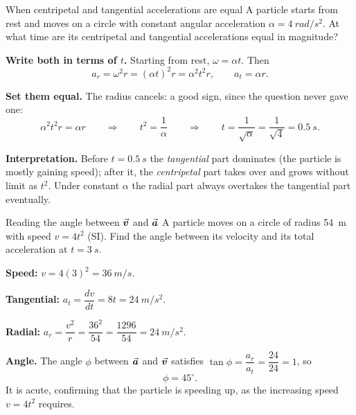 \begin{exbox}{When centripetal and tangential accelerations are equal}
A particle starts from rest and moves on a circle with constant angular acceleration
$\alpha=\SI{4}{rad/s^2}$. At what time are its centripetal and tangential accelerations equal in
magnitude?

 \textbf{Write both in terms of $t$.} Starting from rest, $\omega=\alpha t$. Then
\[
a_r=\omega^{2}r=(\alpha t)^{2}r=\alpha^{2}t^{2}r,
\qquad
a_t=\alpha r.
\]

 \textbf{Set them equal.} The radius cancels: a good sign, since the question never gave
one:
\[
\alpha^{2}t^{2}r=\alpha r
\qquad\Longrightarrow\qquad
t^{2}=\frac{1}{\alpha}
\qquad\Longrightarrow\qquad
t=\frac{1}{\sqrt\alpha}=\frac{1}{\sqrt4}=\SI{0.5}{s}.
\]

 \textbf{Interpretation.} Before $t=\SI{0.5}{s}$ the \emph{tangential} part dominates (the
particle is mostly gaining speed); after it, the \emph{centripetal} part takes over and grows without
limit as $t^{2}$. Under constant $\alpha$ the radial part always overtakes the tangential part
eventually. 
\end{exbox}

\begin{exbox}{Reading the angle between $\vec{\bm{v}}$ and $\vec{\bm{a}}$}
A particle moves on a circle of radius \SI{54}{m} with speed $v=4t^{2}$ (SI). Find the angle between its
velocity and its total acceleration at $t=\SI{3}{s}$.

 \textbf{Speed:} $v=4(3)^{2}=\SI{36}{m/s}$.

 \textbf{Tangential:} $a_t=\dfrac{dv}{dt}=8t=\SI{24}{m/s^2}$.

 \textbf{Radial:} $a_r=\dfrac{v^{2}}{r}=\dfrac{36^{2}}{54}=\dfrac{1296}{54}=\SI{24}{m/s^2}$.

 \textbf{Angle.} The angle $\phi$ between $\vec{\bm{a}}$ and $\vec{\bm{v}}$ satisfies
$\tan\phi=\dfrac{a_r}{a_t}=\dfrac{24}{24}=1$, so
\[
\phi=45^\circ.
\]
It is acute, confirming that the particle is speeding up, as the increasing speed $v=4t^{2}$ requires.
\end{exbox}

